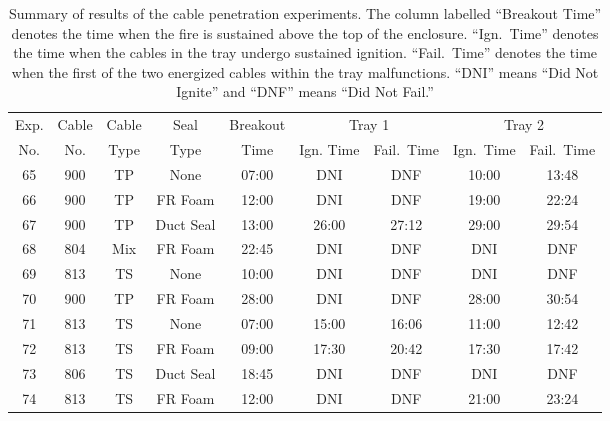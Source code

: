 \begin{table}[ht]
\centering
\caption[Summary of results of penetration experiments]{Summary of results of the cable penetration experiments. The column labelled ``Breakout Time'' denotes the time when the fire is sustained above the top of the enclosure. ``Ign.~Time'' denotes the time when the cables in the tray undergo sustained ignition. ``Fail.~Time'' denotes the time when the first of the two energized cables within the tray malfunctions. ``DNI'' means ``Did Not Ignite'' and ``DNF'' means ``Did Not Fail.'' }
\label{penetration_matrix}
\begin{tabular}{|c|c|c|c|c|c|c|c|c|}
\hline
Exp.   & Cable   & Cable    & Seal             & Breakout  & \multicolumn{2}{|c|}{Tray 1}  & \multicolumn{2}{|c|}{Tray 2}  \\ \cline{6-9}
No.    & No.     & Type     & Type             & Time      & Ign. Time  & Fail.~Time       & Ign.~Time  & Fail.~Time       \\ \hline
65     & 900     & TP       & None             & 07:00     & DNI        & DNF              & 10:00      & 13:48            \\ \hline
66     & 900     & TP       & FR Foam          & 12:00     & DNI        & DNF              & 19:00      & 22:24            \\ \hline
67     & 900     & TP       & Duct Seal        & 13:00     & 26:00      & 27:12            & 29:00      & 29:54            \\ \hline
68     & 804     & Mix      & FR Foam          & 22:45     & DNI        & DNF              & DNI        & DNF              \\ \hline
69     & 813     & TS       & None             & 10:00     & DNI        & DNF              & DNI        & DNF              \\ \hline
70     & 900     & TP       & FR Foam          & 28:00     & DNI        & DNF              & 28:00      & 30:54            \\ \hline
71     & 813     & TS       & None             & 07:00     & 15:00      & 16:06            & 11:00      & 12:42            \\ \hline
72     & 813     & TS       & FR Foam          & 09:00     & 17:30      & 20:42            & 17:30      & 17:42            \\ \hline
73     & 806     & TS       & Duct Seal        & 18:45     & DNI        & DNF              & DNI        & DNF              \\ \hline
74     & 813     & TS       & FR Foam          & 12:00     & DNI        & DNF              & 21:00      & 23:24            \\ \hline

\end{tabular}
\end{table}
